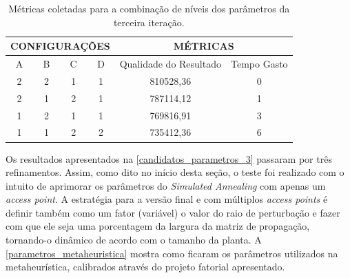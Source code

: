 \documentclass[
	12pt,				%
	twoside,			%
	a4paper,			%
	english,			%
	french,				%
	spanish,			%
	brazil				%
	]{abntex2}
\begin{document}
\begin{table}[ht]
\centering
\caption{Métricas coletadas para a combinação de níveis dos parâmetros da terceira iteração.}
\label{candidatos_parametros_3}
    \begin{tabular}{|c|c|c|c|c|c|}
        \hline
        \multicolumn{4}{|c|}{\textbf{CONFIGURAÇÕES}} & \multicolumn{2}{c|}{\textbf{MÉTRICAS}} \\ \hline
        A         & B         & C         & D        & Qualidade do Resultado  & Tempo Gasto  \\ \hline
        2         & 2         & 1         & 1        & 810528,36               & 0            \\ \hline
        2         & 1         & 2         & 1        & 787114,12               & 1            \\ \hline
        1         & 2         & 1         & 1        & 769816,91               & 3            \\ \hline
        1         & 1         & 2         & 2        & 735412,36               & 6            \\ \hline
    \end{tabular}%
\end{table}

Os resultados apresentados na \autoref{candidatos_parametros_3} passaram
por três refinamentos. Assim, como dito no início desta seção, o teste
foi realizado com o intuito de aprimorar os parâmetros do
\emph{Simulated Annealing} com apenas um \emph{access point}. A
estratégia para a versão final e com múltiplos \emph{access points} é
definir também como um fator (variável) o valor do raio de perturbação e
fazer com que ele seja uma porcentagem da largura da matriz de
propagação, tornando-o dinâmico de acordo com o tamanho da planta. A
\autoref{parametros_metaheuristica} mostra como ficaram os parâmetros
utilizados na metaheurística, calibrados através do projeto fatorial
apresentado.
\end{document}
